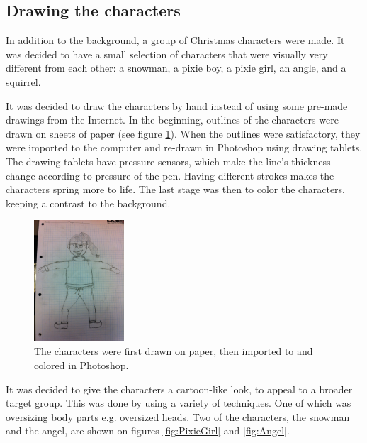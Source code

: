 \subsection{Drawing the characters}
In addition to the background, a group of Christmas characters were made. It was decided to have a small selection of characters that were visually very different from each other: a snowman, a pixie boy, a pixie girl, an angle, and a squirrel.

It was decided to draw the characters by hand instead of using some pre-made drawings from the Internet. In the beginning, outlines of the characters were drawn on sheets of paper (see figure \ref{fig:boy_sketch}). When the outlines were satisfactory, they were imported to the computer and re-drawn in Photoshop using drawing tablets. The drawing tablets have pressure sensors, which make the line's thickness change according to pressure of the pen. Having different strokes makes the characters spring more to life. The last stage was then to color the characters, keeping a contrast to the background.

\begin{figure}[htbp]
\centering
\includegraphics[width=0.30\textwidth]{Pictures/Design/boy_sketch}
\caption{The characters were first drawn on paper, then imported to and colored in Photoshop.}
\label{fig:boy_sketch}
\end{figure}

It was decided to give the characters a cartoon-like look, to appeal to a broader target group. This was done by using a variety of techniques. One of which was oversizing body parts e.g. oversized heads. Two of the characters, the snowman and the angel, are shown on figures \ref{fig:PixieGirl} and \ref{fig:Angel}.

